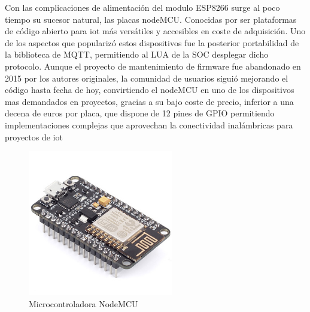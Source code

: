 \vspace{1.5cm}

Con las complicaciones de alimentación del modulo ESP8266 surge al poco tiempo su sucesor natural, las placas nodeMCU. Conocidas por ser plataformas de código abierto para \gls{iot} más versátiles y accesibles en coste de adquisición. Uno de los aspectos que popularizó estos dispositivos fue la posterior portabilidad de la biblioteca de MQTT, permitiendo al LUA de la SOC desplegar dicho protocolo. Aunque el proyecto de mantenimiento de firmware fue abandonado en 2015 por los autores originales, la comunidad de usuarios siguió mejorando el código hasta fecha de hoy, convirtiendo el nodeMCU en uno de los dispositivos mas demandados en proyectos, gracias a su bajo coste de precio, inferior a una decena de euros por placa, que dispone de 12 pines de GPIO permitiendo implementaciones complejas que aprovechan la conectividad inalámbricas para proyectos de \gls{iot}

\begin{figure}[hbt!]
\centering
\includegraphics[height=2.5in]{figures/nodemcu.jpg}
\caption[captura de una nodeMCU]{Microcontroladora NodeMCU\footnotemark}
\end{figure}